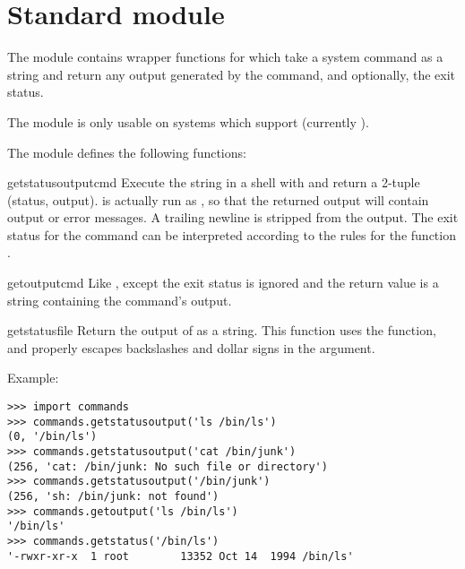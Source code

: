 \section{Standard module }	%

The  module contains wrapper functions for  
which take a system command as a string and return any output generated by 
the command, and optionally, the exit status.

The  module is only usable on systems which support 
 (currently \UNIX{}).

The  module defines the following functions:

\renewcommand{\indexsubitem}{(in module commands)}
\begin{funcdesc}{getstatusoutput}{cmd}
Execute the string  in a shell with  and return
a 2-tuple (status, output).   is actually run as
, so that the returned output will contain output
or error messages. A trailing newline is stripped from the output.
The exit status for the  command can be interpreted according to the
rules for the \C{} function .  
\end{funcdesc}

\begin{funcdesc}{getoutput}{cmd}
Like , except the exit status is ignored and
the return value is a string containing the command's output.  
\end{funcdesc}

\begin{funcdesc}{getstatus}{file}
Return the output of  as a string.  This
function uses the  function, and properly escapes
backslashes and dollar signs in the argument.
\end{funcdesc}

Example:

\begin{verbatim}
>>> import commands
>>> commands.getstatusoutput('ls /bin/ls')
(0, '/bin/ls')
>>> commands.getstatusoutput('cat /bin/junk')
(256, 'cat: /bin/junk: No such file or directory')
>>> commands.getstatusoutput('/bin/junk')
(256, 'sh: /bin/junk: not found')
>>> commands.getoutput('ls /bin/ls')
'/bin/ls'
>>> commands.getstatus('/bin/ls')
'-rwxr-xr-x  1 root        13352 Oct 14  1994 /bin/ls'
\end{verbatim}
